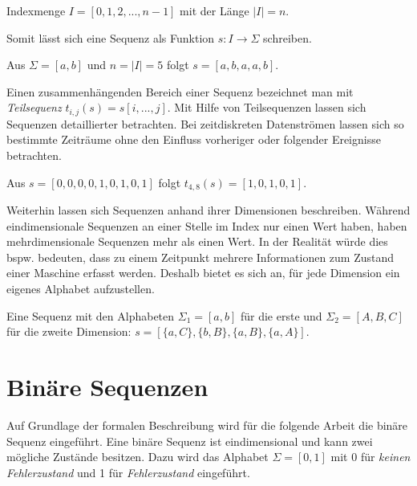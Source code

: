 \begin{theorem}
Indexmenge $I = [0,1,2,...,n-1]$ mit der Länge $|I| = n$.
\end{theorem}

Somit lässt sich eine Sequenz als Funktion $s : I \rightarrow \Sigma$ schreiben.

\begin{theorem}
Aus $\Sigma = [a,b]$ und $n = |I| = 5$ folgt $s = [a,b,a,a,b]$.
\end{theorem}

Einen zusammenhängenden Bereich einer Sequenz bezeichnet man mit \textit{Teilsequenz} $t_{i,j}(s) = s[i,...,j]$. Mit Hilfe von Teilsequenzen lassen sich Sequenzen detaillierter betrachten. Bei zeitdiskreten Datenströmen lassen sich so bestimmte Zeiträume ohne den Einfluss vorheriger oder folgender Ereignisse betrachten. 

\begin{theorem}
Aus $s = [0,0,0,0,1,0,1,0,1]$ folgt $t_{4,8}(s) = [1,0,1,0,1] $.
\end{theorem}

Weiterhin lassen sich Sequenzen anhand ihrer Dimensionen beschreiben. Während eindimensionale Sequenzen an einer Stelle im Index nur einen Wert haben, haben mehrdimensionale Sequenzen mehr als einen Wert. In der Realität würde dies bspw. bedeuten, dass zu einem Zeitpunkt mehrere Informationen zum Zustand einer Maschine erfasst werden. Deshalb bietet es sich an, für jede Dimension ein eigenes Alphabet aufzustellen.

\begin{theorem}
Eine Sequenz mit den Alphabeten $\Sigma_{1} = [a,b]$ für die erste und $\Sigma_{2} = [A,B,C]$ für die zweite Dimension: $s = [\{a,C\},\{b,B\},\{a,B\},\{a,A\}]$.
\end{theorem}

\section{Binäre Sequenzen}
Auf Grundlage der formalen Beschreibung wird für die folgende Arbeit die binäre Sequenz eingeführt. Eine binäre Sequenz ist eindimensional und kann zwei mögliche Zustände besitzen. Dazu wird das Alphabet $\Sigma = [0,1]$ mit 0 für \textit{keinen Fehlerzustand} und 1 für \textit{Fehlerzustand} eingeführt.

